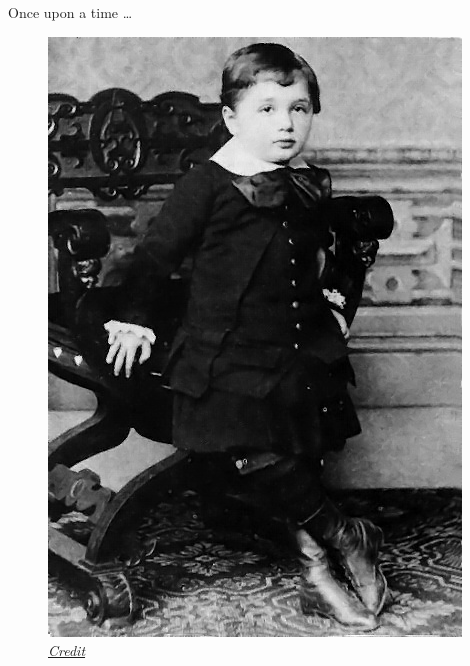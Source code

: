 \begin{frame}{Once upon a time \ldots}


\begin{figure}
\includegraphics[scale=1]{figures/Albert_Einstein_3}
\caption*{\href{By YouTube - http://th.physik.uni-frankfurt.de/~jr/physpiceinstein.html., Public Domain, https://commons.wikimedia.org/w/index.php?curid=1821347}{\emph{Credit}}}
\end{figure}

\end{frame}

